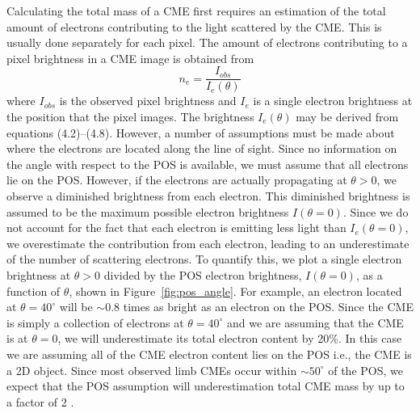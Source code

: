 Calculating the total mass of a CME first requires an estimation of the total amount of electrons contributing to the light scattered by the CME. This is usually done separately for each pixel. The amount of electrons contributing to a pixel brightness in a CME image is obtained from
\begin{equation}
n_{e}=\frac{I_{obs}}{I_{e}(\theta)}%
\end{equation}
where $I_{obs}$ is the observed pixel brightness and $I_e$ is a single electron brightness at the position that the pixel images. 
The brightness $I_e(\theta)$ may be derived from equations (4.2)--(4.8). However, a number of assumptions must be made about where the electrons are located along the line of sight. Since no information on the angle with respect to the POS is available, we must assume that all electrons lie on the POS. However, if the electrons are actually propagating at $\theta>0$, we observe a diminished brightness from each electron. This diminished brightness is assumed to be the maximum possible electron brightness $I(\theta=0)$. Since we do not account for the fact that each electron is emitting less light than $I_e(\theta=0)$, we overestimate the contribution from each electron, leading to an underestimate of the number of scattering electrons. To quantify this, we plot a single electron brightness at $\theta>0$ divided by the POS electron brightness, $I(\theta=0)$, as a function of $\theta$, shown in Figure~\ref{fig:pos_angle}. For example, an electron located at $\theta=40^{\circ}$ will be $\sim$0.8 times as bright as an electron on the POS. Since the CME is simply a collection of electrons at $\theta=40^{\circ}$ and we are assuming that the CME is at $\theta=0$, we will underestimate its total electron content by 20\%. In this case we are assuming all of the CME electron content lies on the POS i.e., the CME is a 2D object. Since most observed limb CMEs occur within $\sim$$50^{\circ}$ of the POS, we expect that the POS assumption will underestimation total CME mass by up to a factor of 2 \citep{vou00}.



